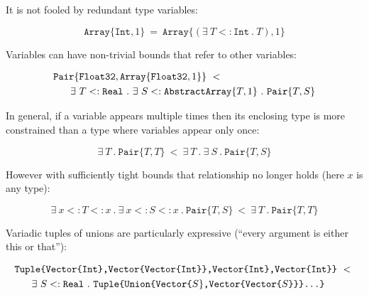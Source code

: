 \vspace{-1ex}
\noindent
It is not fooled by redundant type variables:

\vspace{-2ex}
\[
\texttt{Array}\{\texttt{Int},1\}\ =\ 
  \texttt{Array}\{(\exists\ T<:\texttt{Int}\ .\ T), 1\} \]

\noindent
Variables can have non-trivial bounds that refer to other variables:

\vspace{-3ex}
\begin{singlespace}
\begin{align*}
&\texttt{Pair}\{\texttt{Float32},\texttt{Array}\{\texttt{Float32},1\}\}\ <\ \\
&\hspace{4ex}\exists\ T<:\texttt{Real}\ .\ \exists\ S<:\texttt{AbstractArray}\{T,1\}\ .\ \texttt{Pair}\{T,S\}
\end{align*}
\end{singlespace}


\noindent
In general, if a variable appears multiple times then its enclosing type is
more constrained than a type where variables appear only once:

\vspace{-3ex}
\[
\exists\ T\ .\ \texttt{Pair}\{T,T\}\ <\ \exists\ T\ .\ \exists\ S\ .\ \texttt{Pair}\{T,S\}
\]


\noindent
However with sufficiently tight bounds that relationship no longer holds
(here $x$ is any type):

\vspace{-3ex}
\[
\exists\ x<:T<:x\ .\ \exists\ x<:S<:x\ .\ \texttt{Pair}\{T,S\}\ <\ \exists\ T\ .\ \texttt{Pair}\{T,T\}
\]


\noindent
Variadic tuples of unions are particularly expressive (``every argument is
either this or that''):

\vspace{-3ex}
\begin{singlespace}
\begin{align*}
&\texttt{Tuple\{Vector\{Int\},Vector\{Vector\{Int\}\},Vector\{Int\},Vector\{Int\}\}}\ <\ \\
&\hspace{4ex}\exists\ S<:\texttt{Real}\ .\ \texttt{Tuple\{Union\{Vector\{}S\}\texttt{,Vector\{Vector\{}S\texttt{\}\}\}...\}}
\end{align*}
\end{singlespace}

